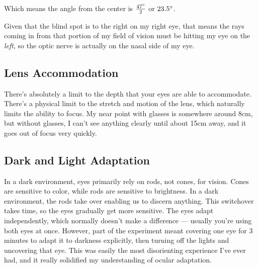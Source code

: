 \documentclass{article}
\begin{document}
Which means the angle from the center is $\frac{47\degree}{2}$ or $23.5\degree$.

Given that the blind spot is to the right on my right eye, that means the rays coming in from that portion of my field of vision must be hitting my eye on the \emph{left}, so the optic nerve is actually on the nasal side of my eye.

\subsection{Lens Accommodation}
There's absolutely a limit to the depth that your eyes are able to accommodate. There's a physical limit to the stretch and motion of the lens, which naturally limits the ability to focus. My near point with glasses is somewhere around 8cm, but without glasses, I can't see anything clearly until about 15cm away, and it goes out of focus very quickly.

\subsection{Dark and Light Adaptation}
In a dark environment, eyes primarily rely on rods, not cones, for vision. Cones are sensitive to color, while rods are sensitive to brightness. In a dark environment, the rods take over enabling us to discern anything. This switchover takes time, so the eyes gradually get more sensitive. The eyes adapt independently, which normally doesn't make a difference --- usually you're using both eyes at once. However, part of the experiment meant covering one eye for 3 minutes to adapt it to darkness explicitly, then turning off the lights and uncovering that eye. This was easily the most disorienting experience I've ever had, and it really solidified my understanding of ocular adaptation.
\end{document}
